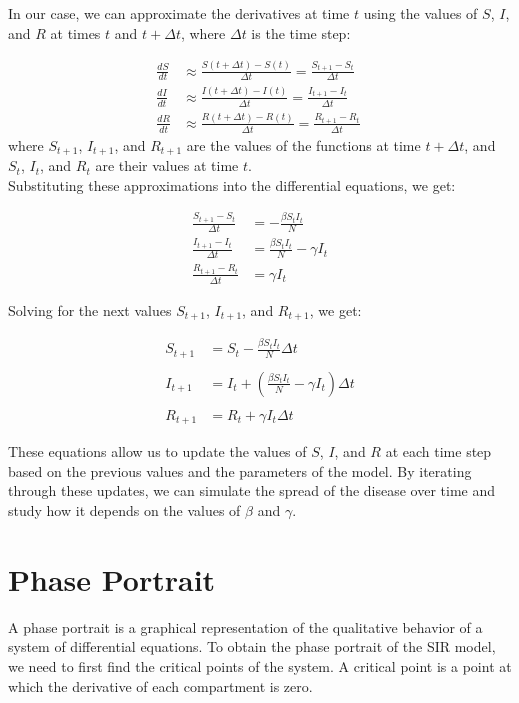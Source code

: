 \documentclass{article}
\begin{document}
\hspace{1em}In our case, we can approximate the derivatives at time $t$ using the values of $S$, $I$, and \hspace{1em}$R$ at times $t$ and $t+\Delta t$, where $\Delta t$ is the time step:

\begin{align*}
\frac{dS}{dt} &\approx \frac{S(t+\Delta t)-S(t)}{\Delta t} = \frac{S_{t+1}-S_t}{\Delta t}\\
\frac{dI}{dt} &\approx \frac{I(t+\Delta t)-I(t)}{\Delta t} = \frac{I_{t+1}-I_t}{\Delta t}\\
\frac{dR}{dt} &\approx \frac{R(t+\Delta t)-R(t)}{\Delta t} = \frac{R_{t+1}-R_t}{\Delta t}\
\end{align*}
\hspace{1em}
where $S_{t+1}$, $I_{t+1}$, and $R_{t+1}$ are the values of the functions at time $t+\Delta t$, and $S_t$, $I_t$, and $R_t$ are their values at time $t$.\\

Substituting these approximations into the differential equations, we get:

\begin{align*}
\frac{S_{t+1} - S_t}{\Delta t} &= -\frac{\beta S_t I_t}{N}\\
\frac{I_{t+1} - I_t}{\Delta t} &= \frac{\beta S_t I_t}{N} - \gamma I_t\\
\frac{R_{t+1} - R_t}{\Delta t} &= \gamma I_t
\end{align*}

Solving for the next values $S_{t+1}$, $I_{t+1}$, and $R_{t+1}$, we get:

\begin{align*}
S_{t+1} &= S_t - \frac{\beta S_t I_t}{N} \Delta t\\ \\
I_{t+1} &= I_t + \left(\frac{\beta S_t I_t}{N} - \gamma I_t \right) \Delta t\\ \\
R_{t+1} &= R_t + \gamma I_t \Delta t
\end{align*}

These equations allow us to update the values of $S$, $I$, and $R$ at each time step based on the previous values and the parameters of the model. By iterating through these updates, we can simulate the spread of the disease over time and study how it depends on the values of $\beta$ and $\gamma$.


\section{Phase Portrait}
A phase portrait is a graphical representation of the qualitative behavior of a system of differential equations. To obtain the phase portrait of the SIR model, we need to first find the critical points of the system. A critical point is a point at which the derivative of each compartment is zero.
\end{document}
